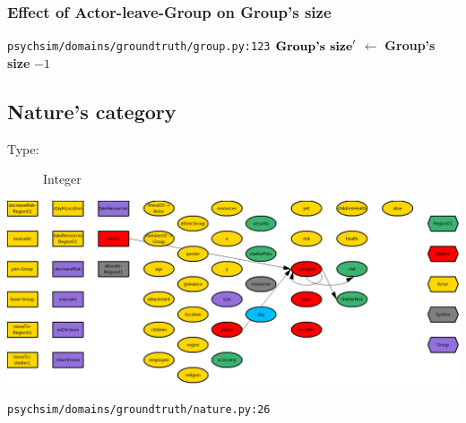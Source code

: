 \documentclass{article}%
\begin{document}
%
\subsubsection{Effect of Actor{-}leave{-}Group on Group's size}%
\label{ssubsec:Effect of Actor{-}leave{-}Group on Group's size}%
\begin{flushleft}%
\verb|psychsim/domains/groundtruth/group.py:123|%
\linebreak%
$\mbox{\textbf{Group's size}} '$%
$\leftarrow$%
\textbf{Group's size}%
${-}1$%
\end{flushleft}

%
\subsection{Nature's category}%
\label{subsec:Nature's category}%
\begin{description}%
\item[Type:]%
Integer%
\end{description}%
\includegraphics[width=\textwidth]{images/categoryOfNature.png}%
\begin{flushleft}%
\verb|psychsim/domains/groundtruth/nature.py:26|%
\end{flushleft}%
\end{document}
